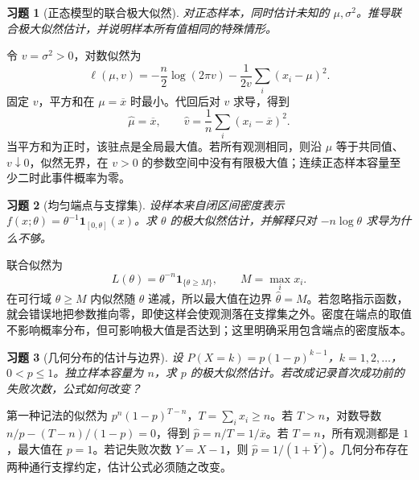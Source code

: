 \documentclass[12pt,fontset=fandol]{ctexart}
\newtheorem{exercise}{习题}[section]
\begin{document}
\begin{exercise}[正态模型的联合极大似然]\label{q:B10.1}
对正态样本，同时估计未知的 $\mu,\sigma^2$。推导联合极大似然估计，并说明样本所有值相同的特殊情形。\par{}
\end{exercise}

\begin{solve}\label{a:B10.1}令 $v=\sigma^2>0$，对数似然为\[\ell(\mu,v)=-\frac n2\log(2\pi v)-\frac{1}{2v}\sum_i(x_i-\mu)^2.\]固定 $v$，平方和在 $\mu=\overline x$ 时最小。代回后对 $v$ 求导，得到\[\widehat\mu=\overline x,\qquad\widehat v=\frac1n\sum_i(x_i-\overline x)^2.\]当平方和为正时，该驻点是全局最大值。若所有观测相同，则沿 $\mu$ 等于共同值、$v\downarrow0$，似然无界，在 $v>0$ 的参数空间中没有有限极大值；连续正态样本容量至少二时此事件概率为零。\end{solve}

\begin{exercise}[均匀端点与支撑集]\label{q:B10.2}
设样本来自闭区间密度表示 $f(x;\theta)=\theta^{-1}\mathbf1_{[0,\theta]}(x)$。求 $\theta$ 的极大似然估计，并解释只对 $-n\log\theta$ 求导为什么不够。\par{}
\end{exercise}

\begin{solve}\label{a:B10.2}联合似然为\[L(\theta)=\theta^{-n}\mathbf1_{\{\theta\ge M\}},\qquad M=\max_i x_i.\]在可行域 $\theta\ge M$ 内似然随 $\theta$ 递减，所以最大值在边界 $\widehat\theta=M$。若忽略指示函数，就会错误地把参数推向零，即使这样会使观测落在支撑集之外。密度在端点的取值不影响概率分布，但可影响极大值是否达到；这里明确采用包含端点的密度版本。\end{solve}

\begin{exercise}[几何分布的估计与边界]\label{q:B10.3}
设 $P(X=k)=p(1-p)^{k-1}$，$k=1,2,\ldots$，$0<p\le1$。独立样本容量为 $n$，求 $p$ 的极大似然估计。若改成记录首次成功前的失败次数，公式如何改变？\par{}
\end{exercise}

\begin{solve}\label{a:B10.3}第一种记法的似然为 $p^n(1-p)^{T-n}$，$T=\sum_i x_i\ge n$。若 $T>n$，对数导数 $n/p-(T-n)/(1-p)=0$，得到 $\widehat p=n/T=1/\overline x$。若 $T=n$，所有观测都是 $1$，最大值在 $p=1$。若记失败次数 $Y=X-1$，则 $\widehat p=1/(1+\overline Y)$。几何分布存在两种通行支撑约定，估计公式必须随之改变。\end{solve}
\end{document}
